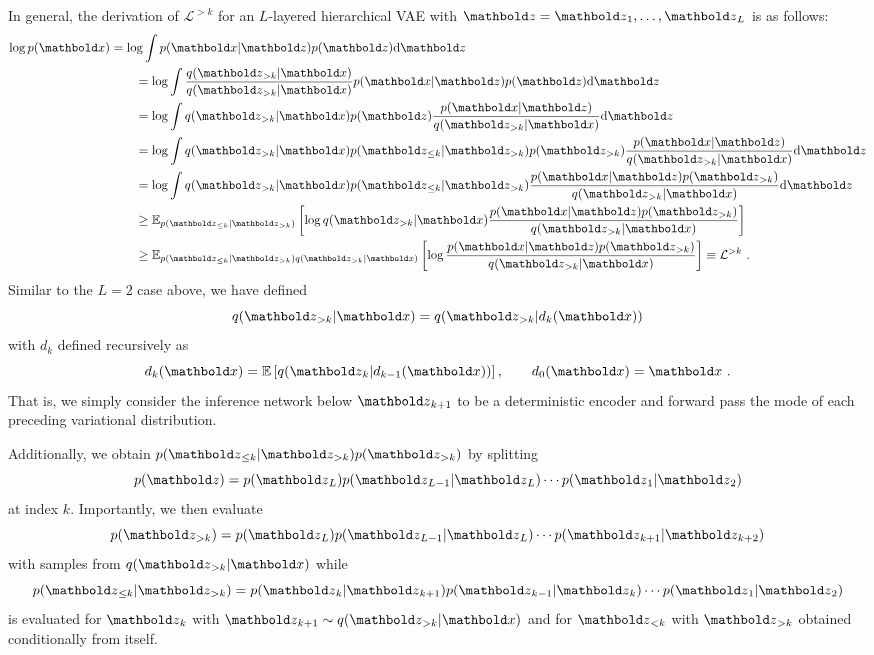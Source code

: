 {In general, the derivation of $\mathcal{L}^{>k}$ for an $L$-layered hierarchical VAE with $\zb=\zb_1,\dots,\zb_L$ is as follows:
\begin{align}
    \log p(\xb) &= \log \int p(\xb|\zb)p(\zb) \text{d}\zb \\
    &\qquad = \log \int \frac{q(\zb_{>k}|\xb)}{q(\zb_{>k}|\xb)} p(\xb|\zb)p(\zb) \text{d}\zb \notag \\
    &\qquad = \log \int q(\zb_{>k}|\xb) p(\zb) \frac{p(\xb|\zb)}{q(\zb_{>k}|\xb)} \text{d}\zb \notag \\
    &\qquad = \log \int q(\zb_{>k}|\xb) p(\zb_{\leq k}|\zb_{>k}) p(\zb_{>k}) \frac{p(\xb|\zb)}{q(\zb_{>k}|\xb)} \text{d}\zb \notag \\
    &\qquad = \log \int q(\zb_{>k}|\xb) p(\zb_{\leq k}|\zb_{>k}) \frac{p(\xb|\zb)p(\zb_{>k})}{q(\zb_{>k}|\xb)} \text{d}\zb \notag \\
    &\qquad \ge \mathbb{E}_{p(\zb_{\leq k}|\zb_{>k})} \left[ \log q(\zb_{>k}|\xb) \frac{p(\xb|\zb)p(\zb_{>k})}{q(\zb_{>k}|\xb)} \right] \notag \\
    &\qquad \ge \mathbb{E}_{p(\zb_{\leq k}|\zb_{>k})q(\zb_{>k}|\xb)} \left[ \log \frac{p(\xb|\zb)p(\zb_{>k})}{q(\zb_{>k}|\xb)} \right] \equiv \mathcal{L}^{>k} \notag \ .
\end{align}
Similar to the $L=2$ case above, we have defined
$$q(\zb_{>k}|\xb) = q(\zb_{>k}|d_k(\xb))$$
with $d_k$ defined recursively as
$$d_k(\xb) = \mathbb{E}\left[q(\zb_k|d_{k-1}(\xb))\right], \qquad d_0(\xb) = \xb\ .$$
That is, we simply consider the inference network below $\zb_{k+1}$ to be a deterministic encoder and forward pass the mode of each preceding variational distribution.

Additionally, we obtain $p(\zb_{\leq k}|\zb_{>k}) p(\zb_{>k})$ by splitting
$$p(\zb)=p(\zb_L)p(\zb_{L-1}|\zb_L)\cdots p(\zb_{1}|\zb_2)$$
at index $k$. Importantly, we then evaluate
$$p(\zb_{>k})=p(\zb_L)p(\zb_{L-1}|\zb_L)\cdots p(\zb_{k+1}|\zb_{k+2})$$
with samples from $q(\zb_{>k}|\xb)$ while
$$p(\zb_{\leq k}|\zb_{>k})=p(\zb_{k}|\zb_{k+1})p(\zb_{k-1}|\zb_{k})\cdots p(\zb_{1}|\zb_{2})$$
is evaluated for $\zb_k$ with $\zb_{k+1} \sim q(\zb_{>k}|\xb)$ and for $\zb_{<k}$ with $\zb_{>k}$ obtained conditionally from itself.

}
